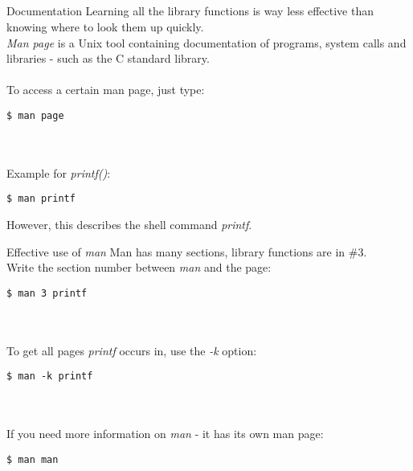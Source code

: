 \subsection{}
\begin{frame}[fragile]{Documentation}
	Learning all the library functions is way less effective than knowing where to look them up quickly. \\
	\textit{Man page} is a Unix tool containing documentation of programs, system calls and libraries - such as the C standard library. \\ \ \\
	To access a certain man page, just type:
	\begin{lstlisting}[numbers=none, basicstyle=\itshape\small]
$ man page
\end{lstlisting} \ \\ \ \\
Example for \textit{printf()}:
	\begin{lstlisting}[numbers=none]
$ man printf
\end{lstlisting}
However, this describes the shell command \textit{printf}.
\end{frame}
\begin{frame}[fragile]{Effective use of \textit{man}}
	Man has many sections, library functions are in \#3. \\
	Write the section number between \textit{man} and the page:
	\begin{lstlisting}[numbers=none]
$ man 3 printf
\end{lstlisting} \ \\ \ \\
	To get all pages \textit{printf} occurs in, use the \textit{-k} option:
	\begin{lstlisting}[numbers=none]
$ man -k printf
\end{lstlisting} \ \\ \ \\
	If you need more information on \textit{man} - it has its own man page:
	\begin{lstlisting}[numbers=none]
$ man man
\end{lstlisting}
\end{frame}


